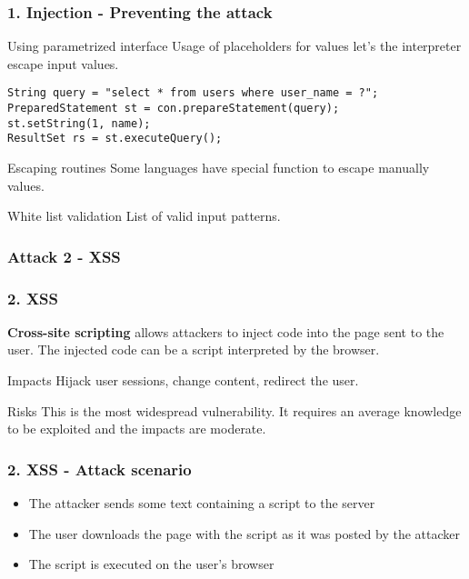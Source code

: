 \begin{frame}[fragile]
\frametitle{1. Injection - Preventing the attack}
\begin{block}{Using parametrized interface}
Usage of placeholders for values let's the interpreter escape input values.
\begin{lstlisting}
String query = "select * from users where user_name = ?";
PreparedStatement st = con.prepareStatement(query);
st.setString(1, name);
ResultSet rs = st.executeQuery();
\end{lstlisting}
\end{block}
\begin{block}{Escaping routines}
Some languages have special function to escape manually values.
\end{block}
\begin{block}{White list validation}
List of valid input patterns.
\end{block}
\end{frame}

\subsubsection{Attack 2 - XSS}

\begin{frame}
\frametitle{2. XSS}
\textbf{Cross-site scripting} allows attackers to inject code into the page
sent to the user. The injected code can be a script interpreted by the
browser.
\begin{block}{Impacts}
Hijack user sessions, change content, redirect the user.
\end{block}
\begin{block}{Risks}
This is \alert{the most widespread} vulnerability.
It requires an average knowledge to be exploited and the impacts are moderate.
\end{block}
\end{frame}

\begin{frame}
\frametitle{2. XSS - Attack scenario}
\begin{itemize}
\item The attacker sends some text containing a script to the server
\item The user downloads the page with the script as it was posted by the
	attacker
\item The script is executed on the user's browser
\end{itemize}
\end{frame}

